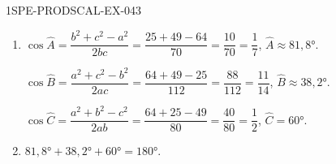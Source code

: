 \begin{corrige}{1SPE-PRODSCAL-EX-043}
\begin{enumerate}
\item $\cos\widehat{A} = \dfrac{b^2+c^2-a^2}{2bc} = \dfrac{25+49-64}{70} = \dfrac{10}{70} = \dfrac{1}{7}$, $\widehat{A} \approx 81{,}8°$.

$\cos\widehat{B} = \dfrac{a^2+c^2-b^2}{2ac} = \dfrac{64+49-25}{112} = \dfrac{88}{112} = \dfrac{11}{14}$, $\widehat{B} \approx 38{,}2°$.

$\cos\widehat{C} = \dfrac{a^2+b^2-c^2}{2ab} = \dfrac{64+25-49}{80} = \dfrac{40}{80} = \dfrac{1}{2}$, $\widehat{C} = 60°$.

\item $81{,}8° + 38{,}2° + 60° = 180°$. \checkmark
\end{enumerate}
\end{corrige}
